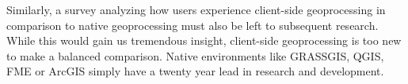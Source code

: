 
Similarly, a survey analyzing how users experience client-side geoprocessing in comparison to native geoprocessing must also be left to subsequent research. While this would gain us tremendous insight, client-side geoprocessing is too new to make a balanced comparison. Native environments like GRASSGIS, QGIS, FME or ArcGIS simply have a twenty year lead in research and development. 
